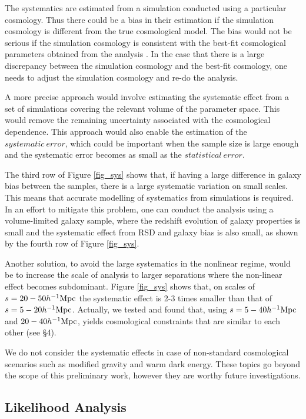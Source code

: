 \documentclass[iop]{emulateapj}
\begin{document}
The systematics are estimated from a simulation conducted using a particular cosmology. 
Thus there could be a bias in their estimation if the simulation cosmology is different from the true cosmological model. 
The bias would not be serious if the simulation cosmology is consistent with the best-fit cosmological parameters obtained from the analysis \cite{Li2016}. 
In the case that there is a large discrepancy between the simulation cosmology and the best-fit cosmology, one needs to adjust the simulation cosmology and re-do the analysis.

A more precise approach would involve estimating the systematic effect from a set of simulations covering the relevant volume of the parameter space. 
This would remove the remaining uncertainty associated with the cosmological dependence. 
This approach would also enable the estimation of the $systematic\ error$, 
which could be important when the sample size is large enough and the systematic error becomes as small as the $statistical\ error$.

The third row of Figure \ref{fig_sys} shows that, 
if having a large difference in galaxy bias between the samples,
there is a large systematic variation on small scales. 
This means that accurate modelling of systematics from simulations is required. 
In an effort to mitigate this problem, one can conduct the analysis using a volume-limited galaxy sample, 
where the redshift evolution of galaxy properties is small and the systematic effect from RSD and galaxy bias is also small,
as shown by the fourth row of Figure \ref{fig_sys}.

Another solution, to avoid the large systematics in the nonlinear regime, 
would be to increase the scale of analysis to larger separations where the non-linear effect becomes subdominant. 
Figure \ref{fig_sys} shows that, 
on scales of $s=20-50 h^{-1} {\rm Mpc}$ the systematic effect is 2-3 times smaller than that of $s=5-20 h^{-1} {\rm Mpc}$. 
Actually, we tested and found that, using $s = 5-40 h^{-1} {\rm Mpc}$ and $20-40 h^{-1} {\rm Mpc}$, 
yields cosmological constraints that are similar to each other (see \S 4). 

We do not consider the systematic effects in case of non-standard cosmological scenarios such as modified gravity and warm dark energy. These topics go beyond the scope of this preliminary work, however they are worthy future investigations.


\subsection{Likelihood Analysis}
\end{document}
